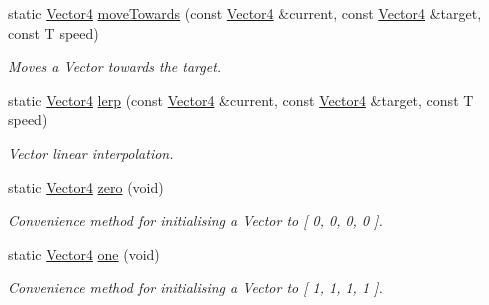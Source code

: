 \begin{DoxyCompactItemize}
static \hyperlink{classsparky_1_1_vector4}{Vector4} \hyperlink{classsparky_1_1_vector4_ab4183e9fe1ed8aeb00c64a6adc61e9b6}{move\+Towards} (const \hyperlink{classsparky_1_1_vector4}{Vector4} \&current, const \hyperlink{classsparky_1_1_vector4}{Vector4} \&target, const T speed)
\begin{DoxyCompactList}\small\item\em Moves a Vector towards the target. \end{DoxyCompactList}\item 
static \hyperlink{classsparky_1_1_vector4}{Vector4} \hyperlink{classsparky_1_1_vector4_a4e9eb21f45d217225521514d5aeeb7a7}{lerp} (const \hyperlink{classsparky_1_1_vector4}{Vector4} \&current, const \hyperlink{classsparky_1_1_vector4}{Vector4} \&target, const T speed)
\begin{DoxyCompactList}\small\item\em Vector linear interpolation. \end{DoxyCompactList}\item 
static \hyperlink{classsparky_1_1_vector4}{Vector4} \hyperlink{classsparky_1_1_vector4_a882aba5add4b8626df89c6589d4158f0}{zero} (void)
\begin{DoxyCompactList}\small\item\em Convenience method for initialising a Vector to \mbox{[} 0, 0, 0, 0 \mbox{]}. \end{DoxyCompactList}\item 
static \hyperlink{classsparky_1_1_vector4}{Vector4} \hyperlink{classsparky_1_1_vector4_a9bf851c744e90d3214b906bd47fb60b2}{one} (void)
\begin{DoxyCompactList}\small\item\em Convenience method for initialising a Vector to \mbox{[} 1, 1, 1, 1 \mbox{]}. \end{DoxyCompactList}\end{DoxyCompactItemize}
